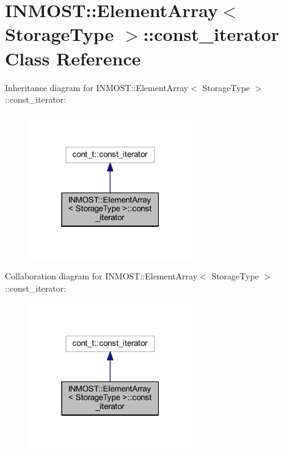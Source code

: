 \hypertarget{classINMOST_1_1ElementArray_1_1const__iterator}{\section{I\-N\-M\-O\-S\-T\-:\-:Element\-Array$<$ Storage\-Type $>$\-:\-:const\-\_\-iterator Class Reference}
\label{classINMOST_1_1ElementArray_1_1const__iterator}
}


Inheritance diagram for I\-N\-M\-O\-S\-T\-:\-:Element\-Array$<$ Storage\-Type $>$\-:\-:const\-\_\-iterator\-:
\nopagebreak
\begin{figure}[H]
\begin{center}
\leavevmode
\includegraphics[width=199pt]{classINMOST_1_1ElementArray_1_1const__iterator__inherit__graph}
\end{center}
\end{figure}


Collaboration diagram for I\-N\-M\-O\-S\-T\-:\-:Element\-Array$<$ Storage\-Type $>$\-:\-:const\-\_\-iterator\-:
\nopagebreak
\begin{figure}[H]
\begin{center}
\leavevmode
\includegraphics[width=199pt]{classINMOST_1_1ElementArray_1_1const__iterator__coll__graph}
\end{center}
\end{figure}
